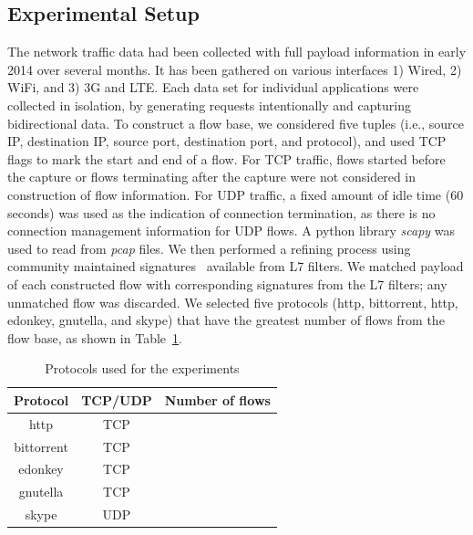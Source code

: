 \documentclass[conference]{IEEEtran}
\begin{document}
\subsection{Experimental Setup}

The network traffic data had been collected with full payload information in early 2014 over several months. It has been gathered on various interfaces 1) Wired, 2) WiFi, and 3) 3G and LTE. Each data set for individual applications were collected in isolation, by generating requests intentionally and capturing bidirectional data.  
To construct a flow base, we considered five tuples (i.e., source IP, destination IP, source port, destination port, and protocol), and used TCP flags to mark the start and end of a flow.
For TCP traffic, flows started before the capture or flows terminating after the capture were not considered in construction of flow information.
For UDP traffic, a fixed amount of idle time (60 seconds) was used as the indication of connection termination, as there is no connection management information for UDP flows.
A python library \emph{scapy}\cite{scapy} was used to read from \emph{pcap} files.
We then performed a refining process using  community maintained signatures~\cite{L7:2007:misc} available from L7 filters. 
We matched payload of each constructed flow with corresponding signatures from the L7 filters; any unmatched flow was discarded. %
We selected five protocols (http, bittorrent, http, edonkey, gnutella, and skype) that have the greatest number of flows from the flow base, as shown in Table~\ref{tab:five_protocols}.

\begin{table}
    \centering
	\caption{Protocols used for the experiments}
	\label{tab:five_protocols}
	\begin{tabular}{|c|c|c|}
		\hline Protocol & TCP/UDP & Number of flows \\ \hline
		\hline http & TCP & \\
		\hline bittorrent & TCP &  \\
		\hline edonkey & TCP &  \\
		\hline gnutella & TCP &  \\
		\hline skype & UDP &  \\
		\hline
	\end{tabular}
\end{table}

\end{document}
